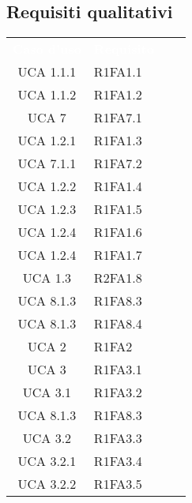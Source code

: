 \subsection{Requisiti qualitativi}
{
\renewcommand{\arraystretch}{1.5}
\centering
\begin{longtable}{ c C{4cm} c c}
\textcolor{white}{\textbf{Caso d'uso}} & \textcolor{white}{\textbf{Requisito}}\\	


UCA 1.1.1 & R1FA1.1\\

UCA 1.1.2 & R1FA1.2\\

UCA 7 & R1FA7.1\\

UCA 1.2.1 & R1FA1.3\\

UCA 7.1.1 & R1FA7.2\\

UCA 1.2.2 & R1FA1.4\\

UCA 1.2.3 & R1FA1.5\\

UCA 1.2.4 & R1FA1.6\\

UCA 1.2.4 & R1FA1.7\\


UCA 1.3 & R2FA1.8\\

UCA 8.1.3 & R1FA8.3\\

UCA 8.1.3 & R1FA8.4\\

UCA 2 & R1FA2\\

UCA 3 & R1FA3.1\\

UCA 3.1 & R1FA3.2\\

UCA 8.1.3 & R1FA8.3\\

UCA 3.2 & R1FA3.3\\

UCA 3.2.1 & R1FA3.4\\


UCA 3.2.2 & R1FA3.5\\


\end{longtable}}
